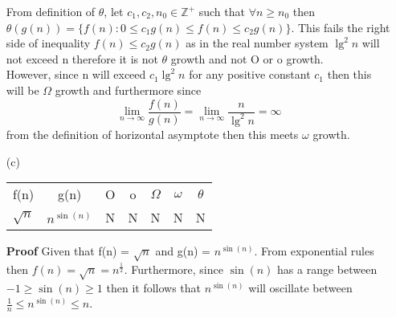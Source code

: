 \documentclass[12pt]{article}
\begin{document}
\begin{itemize}
From definition of $\theta$, let $c_1, c_2, n_0 \in \mathbb{Z^{+}}$ such that $\forall n  \geq n_0$ then $\theta(g(n)) = \{f(n) : 0 \leq c_1 g(n) \leq f(n) \leq c_2 g(n)\}$. This fails the right side of inequality $f(n) \leq c_2 g(n)$ as in the real number system $\lg^2 n$ will not exceed n therefore it is not $\theta $ growth and not O or o growth. \\
However, since n will exceed $c_1\lg^2 n $ for any positive constant $c_1$ then this will be $\Omega$ growth and furthermore since 
\begin{equation*}
     \lim_{n \to \infty} \frac{f(n)}{g(n)} = \lim_{n \to \infty} \frac{n}{\lg^2 n} = \infty
\end{equation*}
from the definition of horizontal asymptote then this meets $\omega$ growth.  
\item[(c)] 
 \begin{center}
    \begin{tabular} {|c|c|c|c|c|c|c|}
    f(n) & g(n) & O & o & $\Omega$ & $\omega$ & $\theta$ \\ 
    $\sqrt{n}$ & $ n^{\sin(n)}$ & N & N & N & N & N
    \end{tabular}
    \end{center}
    \textbf{Proof} Given that f(n) = $\sqrt{n}$ and g(n) = $n^{\sin(n)}$. From exponential rules then $f(n) = \sqrt{n} = n^{\frac{1}{2}}$. Furthermore, since $\sin(n)$ has a range between $-1 \geq \sin(n) \geq 1$ then it follows that $n^{\sin(n)}$ will oscillate between $\frac{1}{n} \leq n^{\sin(n)} \leq n$. 
\end{itemize}
\clearpage
\end{document}
